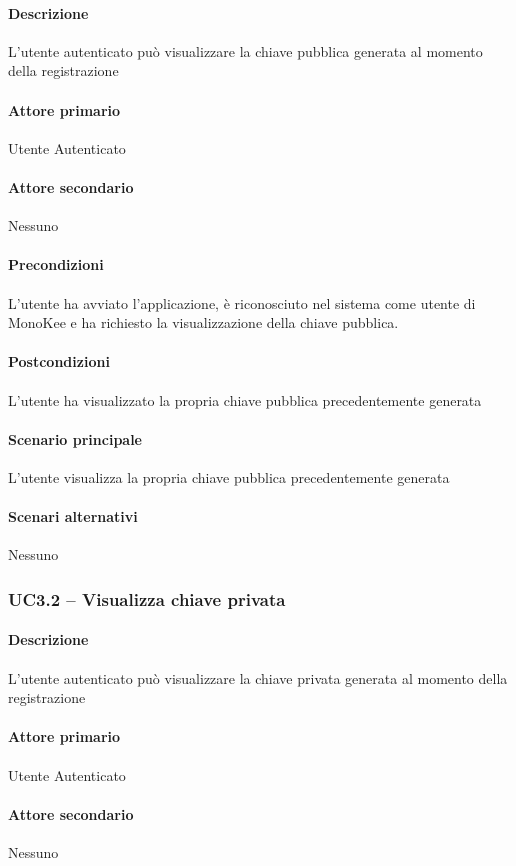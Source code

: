 \paragraph{Descrizione}  L’utente autenticato può visualizzare la chiave pubblica generata al momento della registrazione
\paragraph{Attore primario}  Utente Autenticato
\paragraph{Attore secondario}  Nessuno
\paragraph{Precondizioni}  L’utente ha avviato l’applicazione, è riconosciuto nel sistema come utente di MonoKee e ha richiesto la visualizzazione della chiave pubblica.
\paragraph{Postcondizioni}  L’utente ha visualizzato la propria chiave pubblica precedentemente generata
\paragraph{Scenario principale}  
L’utente visualizza la propria chiave pubblica precedentemente generata
\paragraph{Scenari alternativi}  Nessuno



\subsubsection{UC3.2 – Visualizza chiave privata}
\paragraph{Descrizione}  L’utente autenticato può visualizzare la chiave privata generata al momento della registrazione
\paragraph{Attore primario}  Utente Autenticato
\paragraph{Attore secondario}  Nessuno
